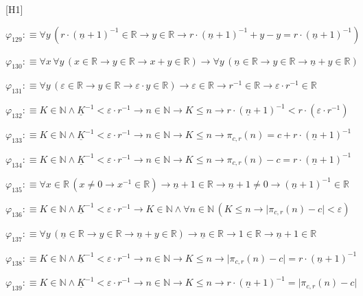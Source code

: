 \begin{fullproof}{[H1]}
\begin{abbrevlist}
\item $\varphi_{129} :\equiv \forall y\,(r \cdot (\underline{n} + 1)^{-1} \in \mathbb{R} \to y \in \mathbb{R} \to r \cdot (\underline{n} + 1)^{-1} + y - y = r \cdot (\underline{n} + 1)^{-1})$
\item $\varphi_{130} :\equiv \forall x\,\forall y\,(x \in \mathbb{R} \to y \in \mathbb{R} \to x + y \in \mathbb{R}) \to \forall y\,(\underline{n} \in \mathbb{R} \to y \in \mathbb{R} \to \underline{n} + y \in \mathbb{R})$
\item $\varphi_{131} :\equiv \forall y\,(\varepsilon \in \mathbb{R} \to y \in \mathbb{R} \to \varepsilon \cdot y \in \mathbb{R}) \to \varepsilon \in \mathbb{R} \to r^{-1} \in \mathbb{R} \to \varepsilon \cdot r^{-1} \in \mathbb{R}$
\item $\varphi_{132} :\equiv K \in \mathbb{N} \land \underline{K}^{-1} < \varepsilon \cdot r^{-1} \to n \in \mathbb{N} \to K \leq n \to r \cdot (\underline{n} + 1)^{-1} < r \cdot (\varepsilon \cdot r^{-1})$
\item $\varphi_{133} :\equiv K \in \mathbb{N} \land \underline{K}^{-1} < \varepsilon \cdot r^{-1} \to n \in \mathbb{N} \to K \leq n \to \pi_{c,r}(n) = c + r \cdot (\underline{n} + 1)^{-1}$
\item $\varphi_{134} :\equiv K \in \mathbb{N} \land \underline{K}^{-1} < \varepsilon \cdot r^{-1} \to n \in \mathbb{N} \to K \leq n \to \pi_{c,r}(n) - c = r \cdot (\underline{n} + 1)^{-1}$
\item $\varphi_{135} :\equiv \forall x \in \mathbb{R}\,(x \neq 0 \to x^{-1} \in \mathbb{R}) \to \underline{n} + 1 \in \mathbb{R} \to \underline{n} + 1 \neq 0 \to (\underline{n} + 1)^{-1} \in \mathbb{R}$
\item $\varphi_{136} :\equiv K \in \mathbb{N} \land \underline{K}^{-1} < \varepsilon \cdot r^{-1} \to K \in \mathbb{N} \land \forall n \in \mathbb{N}\,(K \leq n \to \lvert \pi_{c,r}(n) - c \rvert < \varepsilon)$
\item $\varphi_{137} :\equiv \forall y\,(\underline{n} \in \mathbb{R} \to y \in \mathbb{R} \to \underline{n} + y \in \mathbb{R}) \to \underline{n} \in \mathbb{R} \to 1 \in \mathbb{R} \to \underline{n} + 1 \in \mathbb{R}$
\item $\varphi_{138} :\equiv K \in \mathbb{N} \land \underline{K}^{-1} < \varepsilon \cdot r^{-1} \to n \in \mathbb{N} \to K \leq n \to \lvert \pi_{c,r}(n) - c \rvert = r \cdot (\underline{n} + 1)^{-1}$
\item $\varphi_{139} :\equiv K \in \mathbb{N} \land \underline{K}^{-1} < \varepsilon \cdot r^{-1} \to n \in \mathbb{N} \to K \leq n \to r \cdot (\underline{n} + 1)^{-1} = \lvert \pi_{c,r}(n) - c \rvert$

\end{abbrevlist}
\end{fullproof}
